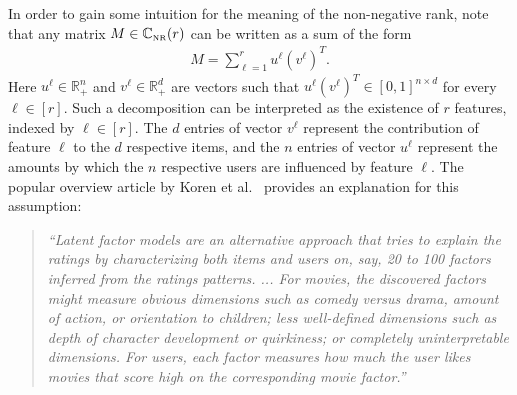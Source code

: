 \documentclass[11pt, hidelinks]{article} %
\newcommand{\reals}{\ensuremath{\mathbb{R}}}
\newcommand{\numrows}{n}
\newcommand{\numcols}{d}
\newcommand{\wtmatrix}{M}
\newcommand{\matrixset}{\mathbb{C}}
\newcommand{\nnset}{\matrixset_{\mbox{\tiny NR}}}
\newcommand{\nnrank}{r}
\newcommand{\lowLeftVec}[1]{u^{#1}}
\newcommand{\lowRightVec}[1]{v^{#1}}
\begin{document}
In order to gain some intuition for the meaning of the non-negative rank,
note that any matrix $\wtmatrix \in \nnset(\nnrank)$ can be written as
a sum of the form
\begin{align*}
\wtmatrix = \sum_{\ell=1}^{\nnrank} \lowLeftVec{\ell} (\lowRightVec{\ell})^T.
\end{align*}
Here $\lowLeftVec{\ell} \in \reals_+^\numrows$ and $\lowRightVec{\ell}
\in \reals_+^{\numcols}$ are vectors such that $\lowLeftVec{\ell}
(\lowRightVec{\ell})^T \in [0,1]^{\numrows \times \numcols}$ for every
$\ell \in [\nnrank]$. Such a decomposition can be interpreted as the
existence of $\nnrank$ features, indexed by $\ell \in [\nnrank]$.  The
$\numcols$ entries of vector $\lowRightVec{\ell}$ represent the
contribution of feature $\ell$ to the $\numcols$ respective items, and
the $\numrows$ entries of vector $\lowLeftVec{\ell}$ represent the
amounts by which the $\numrows$ respective users are influenced by
feature $\ell$. The popular overview article by Koren et
al.~\cite{koren2009matrix} provides an explanation for this
assumption:
\begin{quote}
  \emph{ {``Latent factor models are an alternative approach that
      tries to explain the ratings by characterizing both items and
      users on, say, 20 to 100 factors inferred from the ratings
      patterns. ...  For movies, the discovered factors might measure
      obvious dimensions such as comedy versus drama, amount of
      action, or orientation to children; less well-defined dimensions
      such as depth of character development or quirkiness; or
      completely uninterpretable dimensions. For users, each factor
      measures how much the user likes movies that score high on the
      corresponding movie factor.''}  }
\end{quote}

\end{document}
